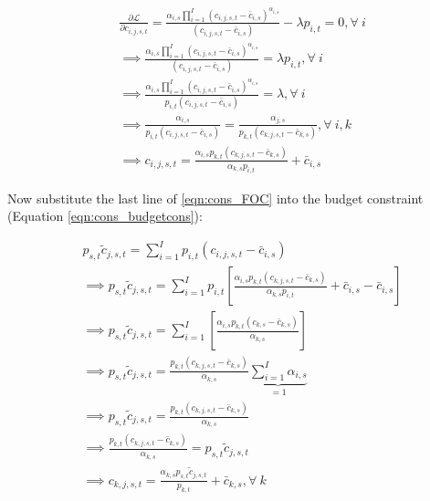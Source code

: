       \begin{equation} \label{eqn:cons_FOC}
      \begin{split}
       & \frac{\partial \mathcal{L}}{\partial c_{i,j,s,t}} = \frac{\alpha_{i,s} \prod_{i=1}^I \left( c_{i,j,s,t} - \bar c_{i,s} \right) ^{\alpha_{i,s}}}{(c_{i,j,s,t}-\bar{c}_{i,s})}-\lambda p_{i,t} = 0, \forall \ i  \\
       & \implies  \frac{\alpha_{i,s} \prod_{i=1}^I \left( c_{i,j,s,t} - \bar c_{i,s} \right) ^{\alpha_{i,s}}}{(c_{i,j,s,t}-\bar{c}_{i,s})} = \lambda p_{i,t}, \forall \ i \\
       & \implies  \frac{\alpha_{i,s} \prod_{i=1}^I \left( c_{i,j,s,t} - \bar c_{i,s} \right) ^{\alpha_{i,s}}}{ p_{i,t}(c_{i,j,s,t}-\bar{c}_{i,s})} = \lambda, \forall \ i \\
       & \implies \frac{\alpha_{i,s}}{p_{i,t}(c_{i,j,s,t}-\bar{c}_{i,s})}=\frac{\alpha_{j,s}}{p_{k,t}(c_{k,j,s,t}-\bar{c}_{k,s})}, \forall \ i,k \\
       & \implies c_{i,j,s,t}= \frac{\alpha_{i,s} p_{k,t}(c_{k,j,s,t}-\bar{c}_{k,s})}{\alpha_{k,s} p_{i,t}} + \bar{c}_{i,s}
       \end{split}
    \end{equation}
    
    Now substitute the last line of \ref{eqn:cons_FOC} into the budget constraint (Equation \ref{eqn:cons_budgetcons}):
    
          \begin{equation} \label{eqn:cons_solve}
      \begin{split}
       & p_{s,t}\tilde{c}_{j,s,t} = \sum_{i=1}^{I}p_{i,t}(c_{i,j,s,t}-\bar{c}_{i,s}) \\
       & \implies  p_{s,t}\tilde{c}_{j,s,t} = \sum_{i=1}^{I}p_{i,t}\left[ \frac{\alpha_{i,s} p_{k,t}(c_{k,j,s,t}-\bar{c}_{k,s})}{\alpha_{k,s} p_{i,t}} + \bar{c}_{i,s}- \bar{c}_{i,s}\right] \\
       & \implies  p_{s,t}\tilde{c}_{j,s,t} = \sum_{i=1}^{I}\left[ \frac{\alpha_{i,s} p_{k,t}(c_{k,s}-\bar{c}_{k,s})}{\alpha_{k,s}}\right] \\
       & \implies  p_{s,t}\tilde{c}_{j,s,t} = \frac{ p_{k,t}(c_{k,j,s,t}-\bar{c}_{k,s})}{\alpha_{k,s}} \underbrace{\sum_{i=1}^{I}\alpha_{i,s}}_{=1} \\	
        & \implies  p_{s,t}\tilde{c}_{j,s,t} = \frac{ p_{k,t}(c_{k,j,s,t}-\bar{c}_{k,s})}{\alpha_{k,s}} \\
        & \implies  \frac{ p_{k,t}(c_{k,j,s,t}-\bar{c}_{k,s})}{\alpha_{k,s}}  = p_{s,t}\tilde{c}_{j,s,t}   \\	
        & \implies  c_{k,j,s,t}  = \frac{\alpha_{k,s} p_{s,t}\tilde{c}_{j,s,t}}{p_{k,t}} + \bar{c}_{k,s},  \forall \ k  \\	
       \end{split}
    \end{equation}
    
